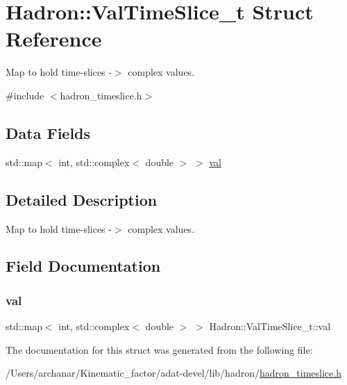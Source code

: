 \hypertarget{structHadron_1_1ValTimeSlice__t}{}\section{Hadron\+:\+:Val\+Time\+Slice\+\_\+t Struct Reference}
\label{structHadron_1_1ValTimeSlice__t}


Map to hold time-\/slices -\/$>$ complex values.  




{\ttfamily \#include $<$hadron\+\_\+timeslice.\+h$>$}

\subsection*{Data Fields}
\begin{DoxyCompactItemize}
\item 
std\+::map$<$ int, std\+::complex$<$ double $>$ $>$ \mbox{\hyperlink{structHadron_1_1ValTimeSlice__t_a4dbe94564e02d7c73010153fc1bc227f}{val}}
\end{DoxyCompactItemize}


\subsection{Detailed Description}
Map to hold time-\/slices -\/$>$ complex values. 

\subsection{Field Documentation}
\mbox{\label{structHadron_1_1ValTimeSlice__t_a4dbe94564e02d7c73010153fc1bc227f}} 
\subsubsection{\texorpdfstring{val}{val}}
{\footnotesize\ttfamily std\+::map$<$ int, std\+::complex$<$ double $>$ $>$ Hadron\+::\+Val\+Time\+Slice\+\_\+t\+::val}



The documentation for this struct was generated from the following file\+:\begin{DoxyCompactItemize}
\item 
/\+Users/archanar/\+Kinematic\+\_\+factor/adat-\/devel/lib/hadron/\mbox{\hyperlink{adat-devel_2lib_2hadron_2hadron__timeslice_8h}{hadron\+\_\+timeslice.\+h}}\end{DoxyCompactItemize}
